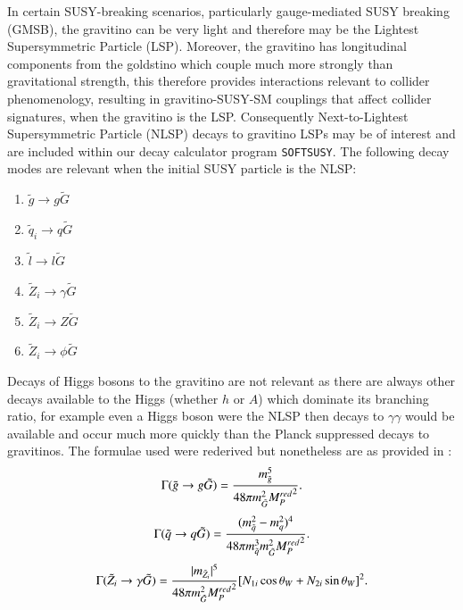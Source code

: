 \documentclass[final,3p,times]{elsarticle}
\begin{document}
In certain SUSY-breaking scenarios, particularly gauge-mediated SUSY breaking (GMSB), the gravitino can be very light and therefore may be the Lightest Supersymmetric Particle (LSP). Moreover, the gravitino has longitudinal components from the goldstino which couple much more strongly than gravitational strength, this therefore provides interactions relevant to collider phenomenology, resulting in gravitino-SUSY-SM couplings that affect collider signatures, when the gravitino is the LSP\@. Consequently Next-to-Lightest Supersymmetric Particle (NLSP) decays to gravitino LSPs may be of interest and are included within our decay calculator program {\tt SOFTSUSY}.
The following decay modes are relevant when the initial SUSY particle is the NLSP:
\begin{enumerate}
\item $\tilde{g} \rightarrow g \tilde{G}$
\item $\tilde{q}_{i} \rightarrow q \tilde{G}$
\item $\tilde{l} \rightarrow l \tilde{G}$
\item $\tilde{Z}_{i} \rightarrow \gamma \tilde{G}$
\item $\tilde{Z}_{i} \rightarrow Z \tilde{G}$
\item $\tilde{Z}_{i} \rightarrow \phi \tilde{G}$
\end{enumerate}
Decays of Higgs bosons to the gravitino are not relevant as there are always other decays available to the Higgs (whether $h$ or $A$) which dominate its branching ratio, for example even a Higgs boson were the NLSP then decays to $\gamma \gamma$ would be available and occur much more quickly than the Planck suppressed decays to gravitinos.
The formulae used were rederived but nonetheless are as provided in \cite{TataBaer}:
\begin{equation} \label{gluggrav}
\Gamma(\tilde{g} \rightarrow g \tilde{G}) = {m_{\tilde{g}}^5 \over 48 \pi m_{\tilde{G}}^2 {M_{P}^{red}}^2}.
\end{equation}
\begin{equation} \label{sqqgrav}
\Gamma(\tilde{q} \rightarrow q \tilde{G}) = {(m_{\tilde{q}}^2 - m_{q}^2)^4 \over 48 \pi m_{\tilde{q}}^3 m_{\tilde{G}}^2 {M_{P}^{red}}^2}.
\end{equation}
\begin{equation} \label{neutgamgrav}
\Gamma(\tilde{Z}_i \rightarrow \gamma \tilde{G}) = {|m_{\tilde{Z}_i}|^5 \over 48 \pi m_{\tilde{G}}^2 {M_{P}^{red}}^2}[N_{1i}\cos\theta_W + N_{2i}\sin\theta_W]^2.
\end{equation}
\end{document}
